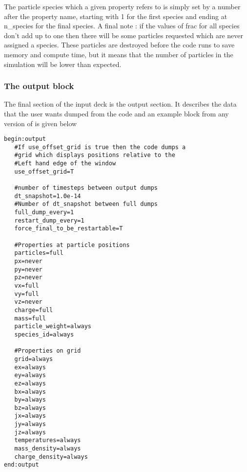 \documentclass[12pt,a4paper]{article}
\newcommand{\simpleboxverbatim}{\begin{Verbatim}[obeytabs=true,frame=single,
  framerule=0.5mm,rulecolor=\color{warwickmid},formatcom=\color{black}]}
\newcommand{\EPOCH}{{\color{warwickdark}\fontfamily{phv}\selectfont{EPOCH}}}
\begin{document}
The particle species which a given property refers to is simply set by a
number after the property name, starting with 1 for the first species and
ending at n\_species for the final species. A final note : if the values of
frac for all species don't add up to one then there will be some particles
requested which are never assigned a species. These particles are destroyed
before the code runs to save memory and compute time, but it means that the
number of particles in the simulation will be lower than expected.\\

\subsubsection{The output block}
The final section of the input deck is the output section. It describes the
data that the user wants dumped from the code and an example block from any
version of {\EPOCH} is given below\\
\simpleboxverbatim
begin:output
   #If use_offset_grid is true then the code dumps a
   #grid which displays positions relative to the
   #Left hand edge of the window
   use_offset_grid=T

   #number of timesteps between output dumps
   dt_snapshot=1.0e-14
   #Number of dt_snapshot between full dumps
   full_dump_every=1
   restart_dump_every=1
   force_final_to_be_restartable=T

   #Properties at particle positions
   particles=full
   px=never
   py=never
   pz=never
   vx=full
   vy=full
   vz=never
   charge=full
   mass=full
   particle_weight=always
   species_id=always

   #Properties on grid
   grid=always
   ex=always
   ey=always
   ez=always
   bx=always
   by=always
   bz=always
   jx=always
   jy=always
   jz=always
   temperatures=always
   mass_density=always
   charge_density=always
end:output
\end{Verbatim}
\end{document}
